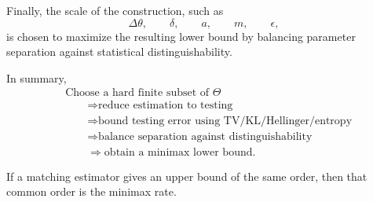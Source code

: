 \documentclass[11pt,twoside]{article}
\begin{document}
Finally, the scale of the construction, such as
\[
\Delta\theta,\qquad
\delta,\qquad
a,\qquad
m,\qquad
\epsilon,
\]
is chosen to maximize the resulting lower bound by balancing parameter separation against statistical distinguishability.

In summary,
\[
\boxed{
\begin{aligned}
&\text{Choose a hard finite subset of }\Theta
\\
&\qquad\Longrightarrow
\text{reduce estimation to testing}
\\
&\qquad\Longrightarrow
\text{bound testing error using TV/KL/Hellinger/entropy}
\\
&\qquad\Longrightarrow
\text{balance separation against distinguishability}
\\
&\qquad\Longrightarrow
\text{obtain a minimax lower bound}.
\end{aligned}
}
\]

If a matching estimator gives an upper bound of the same order, then that common order is the minimax rate.
\clearpage


\end{document}
